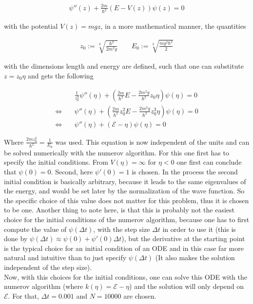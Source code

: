 \documentclass[12pt, a4paper]{article}
\begin{document}
  \begin{align} 
    \psi''(z) + \frac{2 m}{\hbar^2} (E - V(z)) \psi(z) = 0
  \end{align}

  \noindent
  with the potential $V(z) = m g z$, in a more mathematical manner, the quantities

  \begin{align}
    z_0 := \sqrt[3]{\frac{\hbar^2}{2 m^2 g}} \qquad E_0 := \sqrt[3]{\frac{m g^2 \hbar^2}{2}}
  \end{align}

  \noindent
  with the dimensions length and energy are defined, such that one can substitute $z = z_0 \eta$ and gets the following

  \begin{align}
    & \frac{1}{z_0^2} \psi''(\eta) + \left(\frac{2 m}{\hbar^2} E - \frac{2 m^2 g}{\hbar^2} z_0 \eta \right) \psi(\eta) = 0
    \nonumber \\
    \Leftrightarrow \quad & \psi''(\eta) + \left( \frac{2 m}{\hbar^2} z_0^2 E - \frac{2 m^2 g}{\hbar^2} z_0^3 \eta \right) \psi(\eta) = 0 \nonumber \\
    \Leftrightarrow \quad & \psi''(\eta) + \left( \mathcal{E} - \eta \right) \psi(\eta) = 0
    \label{eq_schrd}
  \end{align}
 
  \noindent
  Where $\frac{2 m z_0^2}{\hbar^2} = \frac{1}{E_0}$ was used. This equation is now independent of the units and can be solved numerically with the numerov algorithm. For this one first has to specify the initial conditions. From $V(\eta) = \infty$ for $\eta < 0$ one first can conclude that $\psi(0) = 0$. Second, here $\psi'(0) = 1$ is chosen. In the process the second initial condition is basically arbitrary, because it leads to the same eigenvalues of the energy, and would be set later by the normalization of the wave function. So the specific choice of this value does not matter for this problem, thus it is chosen to be one. Another thing to note here, is that this is probably not the easiest choice for the initial conditions of the numerov algorithm, because one has to first compute the value of $\psi(\Delta t)$, with the step size $\Delta t$ in order to use it (this is done by $\psi(\Delta t) \approx \psi(0) + \psi'(0) \Delta t$), but the derivative at the starting point is the typical choice for an initial condition of an ODE and in this case far more natural and intuitive than to just specify $\psi(\Delta t)$ (It also makes the solution independent of the step size).\\
  Now, with this choices for the initial conditions, one can solve this ODE with the numerov algorithm (where $k(\eta) = \mathcal{E} - \eta$) and the solution will only depend on $\mathcal{E}$. For that, $\Delta t = 0.001$ and $N = 10000$ are chosen. \\
\end{document}
